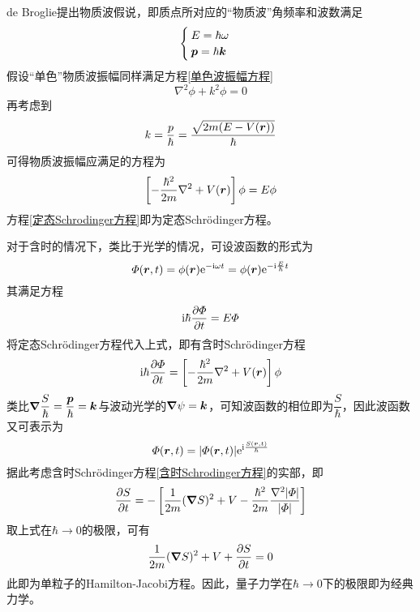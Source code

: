 de Broglie提出物质波假说，即质点所对应的``物质波''角频率和波数满足
\begin{equation}
\begin{cases}
	E = \hbar \omega \\
	\boldsymbol{p} = \hbar \boldsymbol{k}
\end{cases}
\end{equation}
假设``单色''物质波振幅同样满足方程\eqref{单色波振幅方程}
\begin{equation*}
	\nabla^2 \phi + k^2 \phi = 0
\end{equation*}
再考虑到
\begin{equation*}
	k = \frac{p}{\hbar} = \frac{\sqrt{2m(E-V(\boldsymbol{r}))}}{\hbar}
\end{equation*}
可得物质波振幅应满足的方程为
\begin{equation}
	\left[-\frac{\hbar^2}{2m} \nabla^2 + V(\boldsymbol{r})\right] \phi = E\phi
	\label{定态Schrodinger方程}
\end{equation}
方程\eqref{定态Schrodinger方程}即为{\heiti 定态Schr\"{o}dinger方程}。

对于含时的情况下，类比于光学的情况，可设波函数的形式为
\begin{equation*}
	\varPhi(\boldsymbol{r},t) = \phi(\boldsymbol{r}) \mathrm{e}^{-\mathrm{i} \omega t} = \phi(\boldsymbol{r}) \mathrm{e}^{-\mathrm{i} \frac{E}{\hbar} t}
\end{equation*}
其满足方程
\begin{equation}
	\mathrm{i}\hbar \frac{\partial \varPhi}{\partial t} = E\varPhi
\end{equation}
将定态Schr\"{o}dinger方程代入上式，即有{\heiti 含时Schr\"{o}dinger方程}
\begin{equation}
	\mathrm{i}\hbar \frac{\partial \varPhi}{\partial t} = \left[-\frac{\hbar^2}{2m} \nabla^2 + V(\boldsymbol{r})\right] \phi
	\label{含时Schrodinger方程}
\end{equation}
类比$\boldsymbol{\nabla} \dfrac{S}{\hbar} = \dfrac{\boldsymbol{p}}{\hbar} = \boldsymbol{k}$与波动光学的$\boldsymbol{\nabla} \psi = \boldsymbol{k}$，可知波函数的相位即为$\dfrac{S}{\hbar}$，因此波函数又可表示为
\begin{equation*}
	\varPhi(\boldsymbol{r},t) = |\varPhi(\boldsymbol{r},t)| \mathrm{e}^{\mathrm{i}\frac{S(\boldsymbol{r},t)}{\hbar}}
\end{equation*}
据此考虑含时Schr\"{o}dinger方程\eqref{含时Schrodinger方程}的实部，即
\begin{equation*}
	\frac{\partial S}{\partial t} = -\left[\frac{1}{2m} (\boldsymbol{\nabla} S)^2 + V - \frac{\hbar^2}{2m} \frac{\nabla^2 |\varPhi|}{|\varPhi|}\right]
\end{equation*}
取上式在$\hbar \to 0$的极限，可有
\begin{equation*}
	\frac{1}{2m} (\boldsymbol{\nabla} S)^2 + V + \frac{\partial S}{\partial t} = 0
\end{equation*}
此即为单粒子的Hamilton-Jacobi方程。因此，量子力学在$\hbar \to 0$下的极限即为经典力学。

